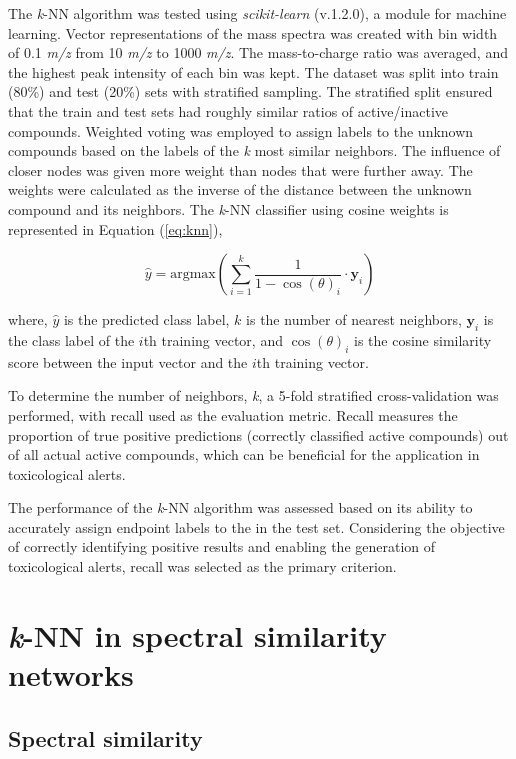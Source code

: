 The \textit{k}-NN algorithm was tested using \textit{scikit-learn} (v.1.2.0), a module for machine learning. Vector representations of the mass spectra was created with bin width of 0.1 \textit{m/z} from 10 \textit{m/z} to 1000 \textit{m/z}. The mass-to-charge ratio was averaged, and the highest peak intensity of each bin was kept. The dataset was split into train (80\%) and test (20\%) sets with stratified sampling. The stratified split ensured that the train and test sets had roughly similar ratios of active/inactive compounds. Weighted voting was employed to assign labels to the unknown compounds based on the labels of the \textit{k} most similar neighbors. The influence of closer nodes was given more weight than nodes that were further away. The weights were calculated as the inverse of the distance between the unknown compound and its neighbors. The \textit{k}-NN classifier using cosine weights is represented in Equation (\ref{eq:knn}),

\begin{equation}
\label{eq:knn}
\hat{y} = \text{{argmax}}\left(\sum_{i=1}^{k}  \frac{1}{1-\cos(\theta)_i} \cdot \mathbf{y}_i\right)
\end{equation}

where, $\hat{y}$ is the predicted class label, $k$ is the number of nearest neighbors, $\mathbf{y}_i$ is the class label of the $i$th training vector, and $\cos(\theta)_i$ is the cosine similarity score between the input vector and the $i$th training vector.

To determine the number of neighbors, \textit{k}, a 5-fold stratified cross-validation was performed, with recall used as the evaluation metric. Recall measures the proportion of true positive predictions (correctly classified active compounds) out of all actual active compounds, which can be beneficial for the application in toxicological alerts.

The performance of the \textit{k}-NN algorithm was assessed based on its ability to accurately assign endpoint labels to the \tMS{} in the test set.  Considering the objective of correctly identifying positive results and enabling the generation of toxicological alerts, recall was selected as the primary criterion.

\section*{\textit{k}-NN in spectral similarity networks}

\subsection*{Spectral similarity}

